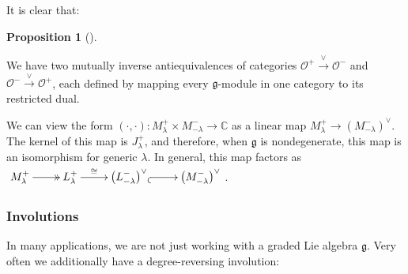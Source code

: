 \documentclass
[numbers=enddot,12pt,final,onecolumn,german,notitlepage]{scrartcl}%
\makeatletter
\newcommand{\arinj}{\ar@{_{(}->}}
\newcommand{\arsurj}{\ar@{->>}}
\theoremstyle{definition}
\newtheorem{prop}[theo]{Proposition}
\newenvironment{proposition}[1][]
{\begin{prop}[#1]\begin{leftbar}}
{\end{leftbar}\end{prop}}
\makeatother
\begin{document}
It is clear that:

\begin{proposition}
We have two mutually inverse antiequivalences of categories $\mathcal{O}%
^{+}\overset{\vee}{\rightarrow}\mathcal{O}^{-}$ and $\mathcal{O}%
^{-}\overset{\vee}{\rightarrow}\mathcal{O}^{+}$, each defined by mapping every
$\mathfrak{g}$-module in one category to its restricted dual.
\end{proposition}

We can view the form $\left(  \cdot,\cdot\right)  :M_{\lambda}^{+}\times
M_{-\lambda}^{-}\rightarrow\mathbb{C}$ as a linear map $M_{\lambda}%
^{+}\rightarrow\left(  M_{-\lambda}^{-}\right)  ^{\vee}$. The kernel of this
map is $J_{\lambda}^{+}$, and therefore, when $\mathfrak{g}$ is nondegenerate,
this map is an isomorphism for generic $\lambda$. In general, this map factors
as $%
\xymatrix{
M^{+}_{\lambda} \arsurj[r] & L^{+}_{\lambda} \ar[r]^-{\cong} &
\left(L^{-}_{-\lambda}\right)^{\vee} \arinj[r] & \left(M^{-}_{-\lambda}%
\right)^{\vee}
}%
$.

\subsubsection{Involutions}

In many applications, we are not just working with a graded Lie algebra
$\mathfrak{g}$. Very often we additionally have a degree-reversing involution:
\end{document}
